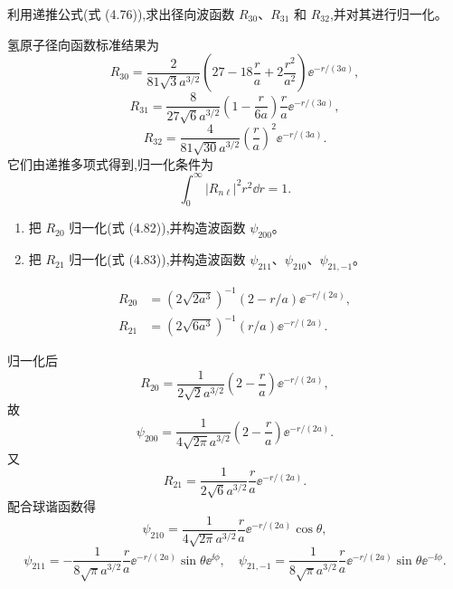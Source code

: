 \begin{question}
利用递推公式(式 (4.76)),求出径向波函数 $R_{30}$、$R_{31}$ 和 $R_{32}$,并对其进行归一化。

\par\smallskip
{}

\begin{solution}

氢原子径向函数标准结果为
\[
R_{30}=\frac{2}{81\sqrt3a^{3/2}}\left(27-18\frac{r}{a}+2\frac{r^2}{a^2}\right)\ee^{-r/(3a)},
\]
\[
R_{31}=\frac{8}{27\sqrt6a^{3/2}}\left(1-\frac{r}{6a}\right)\frac{r}{a}\ee^{-r/(3a)},
\]
\[
R_{32}=\frac{4}{81\sqrt{30}a^{3/2}}\left(\frac{r}{a}\right)^2\ee^{-r/(3a)}.
\]
它们由递推多项式得到,归一化条件为
\[
\int_0^\infty |R_{n\ell}|^2r^2\dd r=1.
\]

\end{solution}
\end{question}

\begin{question}
\begin{enumerate}
\item 把 $R_{20}$ 归一化(式 (4.82)),并构造波函数 $\psi_{200}$。
\item 把 $R_{21}$ 归一化(式 (4.83)),并构造波函数 $\psi_{211}$、$\psi_{210}$、$\psi_{21,-1}$。
\end{enumerate}

\par\smallskip
{}\[\begin{aligned}R_{20}&=(2\sqrt{2a^3})^{-1}(2-r/a)\ee^{-r/(2a)},\\R_{21}&=(2\sqrt{6a^3})^{-1}(r/a)\ee^{-r/(2a)}.\end{aligned}\]

\begin{solution}

归一化后
\[
R_{20}=\frac{1}{2\sqrt2a^{3/2}}\left(2-\frac{r}{a}\right)\ee^{-r/(2a)},
\]
故
\[
\psi_{200}=\frac{1}{4\sqrt{2\pi}a^{3/2}}\left(2-\frac{r}{a}\right)\ee^{-r/(2a)}.
\]
又
\[
R_{21}=\frac{1}{2\sqrt6a^{3/2}}\frac{r}{a}\ee^{-r/(2a)}.
\]
配合球谐函数得
\[
\psi_{210}=\frac{1}{4\sqrt{2\pi}a^{3/2}}\frac{r}{a}\ee^{-r/(2a)}\cos\theta,
\]
\[
\psi_{211}=-\frac{1}{8\sqrt\pi a^{3/2}}\frac{r}{a}\ee^{-r/(2a)}\sin\theta \ee^{\ii\phi},
\quad
\psi_{21,-1}=\frac{1}{8\sqrt\pi a^{3/2}}\frac{r}{a}\ee^{-r/(2a)}\sin\theta \ee^{-\ii\phi}.
\]

\end{solution}
\end{question}

